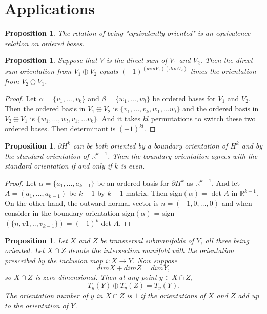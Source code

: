 \documentclass[psamsfonts]{amsart}
\newtheorem{prop}[theorem]{Proposition}
\theoremstyle{definition}
\theoremstyle{remark}
\numberwithin{equation}{section}
\begin{document}
	\section{Applications}
	\begin{prop}
		The relation of being "equivalently oriented" is an equivalence relation on ordered bases.
	\end{prop}
	\begin{prop}
		Suppose that $V$ is the direct sum of $V_1$ and $V_2$. Then the direct sum orientation from $V_1 \oplus V_2$ equals $(-1)^{(dimV_1)(dimV_2)}$ times the orientation from $V_2 \oplus V_1$.
	\end{prop}
	\begin{proof}
		Let $\alpha = \{v_1,...,v_k\}$ and $\beta = \{w_1,...,w_l\}$ be ordered bases for $V_1$ and $V_2$. Then the ordered basis in $V_1 \oplus V_2$ is $\{v_1,...,v_k,w_1,...w_l\}$ and the ordered basis in $V_2 \oplus V_1$ is $\{w_1,...,w_l,v_1,...v_k\}$. And it takes $kl$ permutations to switch these two ordered bases. Then determinant is $(-1)^{kl}$.
	\end{proof}
	\begin{prop}
		$\partial H^k$ can be both oriented by a boundary orientation of $H^k$ and by the standard orientation of $\mathbb{R}^{k-1}$. Then the boundary orientation agrees with the standard orientation if and only if $k$ is even.
	\end{prop}
	\begin{proof}
		Let $\alpha = \{ a_1,...,a_{k-1} \} $ be an ordered basis for $\partial H^k$ as $\mathbb{R}^{k-1}$. And let $A = (a_1,...,a_{k-1})$ be $k-1$ by $k-1$ matrix. Then sign$(\alpha) =$ det $A$ in $\mathbb{R}^{k-1}$. On the other hand, the outward normal vector is $n=(-1,0,...,0)$ and when consider in the boundary orientation sign$(\alpha)$ = sign$(\{ n,v1,..,v_{k-1} \}) = (-1)^k$ det $A$.
	\end{proof}
	\begin{prop}
		Let $X$ and $Z$ be transversal submanifolds of $Y$, all three being oriented. Let $X \cap Z$ denote the intersection manifold with the orientation prescribed by the inclusion map $i: X \to Y$. Now suppose 
		\begin{equation}
			dim X + dim Z = dim Y,
		\end{equation}
		so $X \cap Z$ is zero dimensional. Then at any point $y \in X \cap Z$,
		\begin{equation}
			T_y(Y) \oplus T_y(Z) = T_y(Y).
		\end{equation}
		The orientation number of $y$ in $X \cap Z$ is $1$ if the orientations of $X$ and $Z$ add up to the orientation of $Y$.
	\end{prop}
\end{document}
